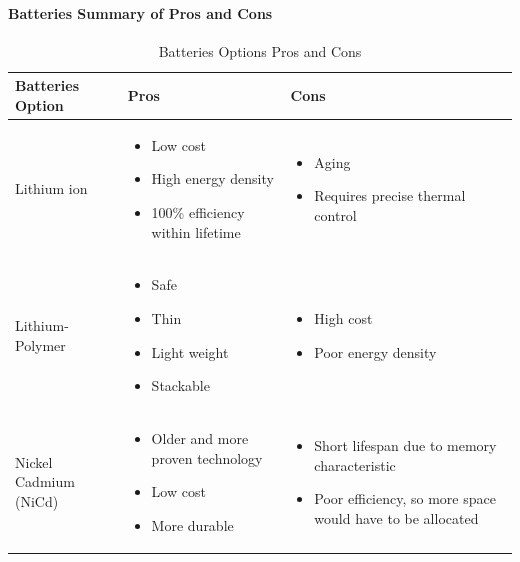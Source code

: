 \documentclass{ece}
\begin{document}
\paragraph{Batteries Summary of Pros and Cons}
\begin{table}[H]
\centering
\begin{tabular}{|p{}|p{}|p{}|} 
\hline
\textbf{Batteries Option} & \textbf{Pros} & \textbf{Cons}
\\
\hline
     Lithium ion
     &
    \begin{itemize}
        \item Low cost
        \item High energy density
        \item 100\% efficiency within lifetime
    \end{itemize}
    &
    \begin{itemize}
        \item Aging
        \item Requires precise thermal control
    \end{itemize}
    \\
\hline
     Lithium-Polymer
     &
    \begin{itemize}
        \item Safe
        \item Thin
        \item Light weight
        \item Stackable
    \end{itemize}
    &
    \begin{itemize}
        \item High cost
        \item Poor energy density
    \end{itemize}
    \\
\hline
    Nickel Cadmium (NiCd)
    &
    \begin{itemize}
        \item Older and more proven technology
        \item Low cost
        \item More durable
    \end{itemize}
    &
    \begin{itemize}
        \item Short lifespan due to memory characteristic
        \item Poor efficiency, so more space would have to be allocated
    \end{itemize}
    \\
\hline
\end{tabular}
\caption{Batteries Options Pros and Cons}
\label{tbl:Batteries_ProCon}
\end{table}
\end{document}
